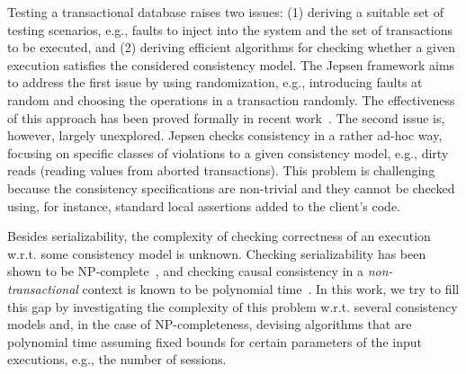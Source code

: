 Testing a transactional database raises two issues: (1) deriving a suitable set of testing scenarios, e.g., faults to inject into the system and the set of transactions to be executed, and (2) deriving efficient algorithms for checking whether a given execution satisfies the considered consistency model. The Jepsen framework aims to address the first issue by using randomization, 
e.g., introducing faults at random and choosing the operations in a transaction randomly. The effectiveness of this approach has been proved formally in recent work~\cite{DBLP:journals/pacmpl/OzkanMNBW18}. The second issue is, however, largely unexplored. Jepsen checks consistency in a rather ad-hoc way, focusing on specific classes of violations to a given consistency model, e.g., dirty reads (reading values from aborted transactions). This problem is challenging because the consistency specifications are non-trivial and they cannot be checked using, for instance, standard local assertions added to the client's code. 

Besides serializability, the complexity of checking correctness of an execution w.r.t. some consistency model is unknown. Checking serializability has been shown to be NP-complete~\cite{DBLP:journals/jacm/Papadimitriou79b}, and checking causal consistency in a \emph{non-transactional} context is known to be polynomial time~\cite{DBLP:conf/popl/BouajjaniEGH17}. In this work, we try to fill this gap by investigating the complexity of this problem w.r.t. several consistency models and, in the case of NP-completeness, devising algorithms that are polynomial time assuming fixed bounds for certain parameters of the input executions, e.g., the number of sessions. 

